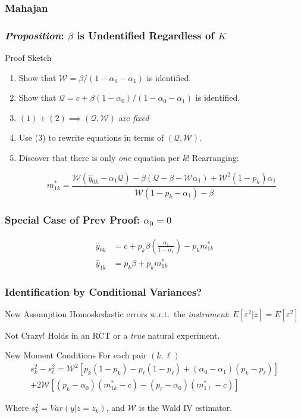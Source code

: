 \documentclass{beamer}
\begin{document}
\begin{frame}
  \frametitle{Mahajan}
\end{frame}
\begin{frame}
  \frametitle{\emph{Proposition}: $\beta$ is Undentified Regardless of $K$}
  \begin{block}{Proof Sketch}
    \begin{enumerate}[(1)]
      \item Show that $\mathcal{W}= \beta/(1-\alpha_0 - \alpha_1)$ is identified. 
      \item Show that $\mathcal{Q} = c + \beta(1-\alpha_0)/(1-\alpha_0-\alpha_1)$ is identified.
      \item $(1) + (2) \implies (\mathcal{Q}, \mathcal{W})$ are \emph{fixed}
      \item Use (3) to rewrite equations in terms of $(\mathcal{Q}, \mathcal{W})$.
      \item Discover that there is only \emph{one} equation per $k$! Rearranging: 

        \[m^*_{1k} = \frac{\mathcal{W}(\hat{y}_{0k}-\alpha_1 \mathcal{Q}) - \beta(\mathcal{Q}-\beta-\mathcal{W}\alpha_1) + \mathcal{W}^2(1-p_k)\alpha_1}{\mathcal{W}(1-p_k - \alpha_1) - \beta}\]
    \end{enumerate}

  \end{block} 
    
\end{frame}
\begin{frame}
  \frametitle{Special Case of Prev Proof: $\alpha_0 = 0$}
\begin{align*}
  \hat{y}_{0k} &=c + p_k \beta \left(\frac{\alpha_1}{1 -  \alpha_1}\right) - p _k m_{1k}^* \\[1.5ex]
  \hat{y}_{1k} &=p_k \beta + p _k m_{1k}^*
\end{align*}
\end{frame}
\begin{frame}
  \frametitle{Identification by Conditional Variances?} 
  \begin{block}{New Assumption}
    Homoskedastic errors w.r.t.\ the \emph{instrument}: $E[\varepsilon^2|z]=E[\varepsilon^2]$
  \end{block}
  \begin{block}{Not Crazy!}
    Holds in an RCT or a \emph{true} natural experiment.
  \end{block}
  \begin{alertblock}{New Moment Conditions}
    For each pair $(k,\ell)$
\begin{align*}
  s^2_k - s^2_\ell = \mathcal{W}^2\left[p_k(1-p_k) - p_\ell(1-p_\ell) + (\alpha_0 - \alpha_1)(p_k - p_\ell)\right]\\  
  + 2\mathcal{W}\left[(p_k - \alpha_0)(m^*_{1k}-c) - (p_\ell - \alpha_0)(m^*_{1\ell}-c)\right]
\end{align*}

\vspace{0.5em}
Where $s^2_k = Var(y|z=z_k)$, and $\mathcal{W}$ is the Wald IV estimator. 
  \end{alertblock}
\end{frame}
\end{document}
